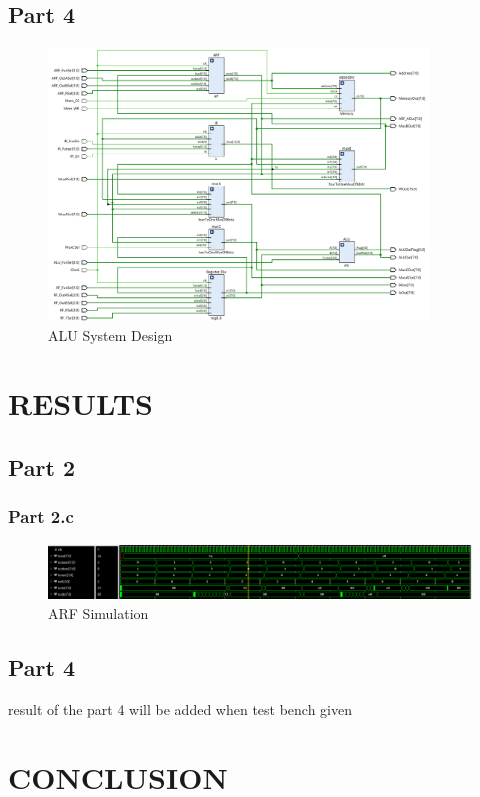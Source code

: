 \documentclass[pdftex,12pt,a4paper]{article}
\begin{document}
\subsection{Part 4}
    \begin{figure}[H]
    	\centering
    	\includegraphics[width=0.9\textwidth]{design/ALU_system.png}	
    	\caption{ALU System Design}
    	\label{ALU System Design}
    \end{figure}








\section{RESULTS}
\subsection{Part 2}
\subsubsection{Part 2.c}
\begin{figure}[H]
	\centering
	\includegraphics[width=1\textwidth]{results/arf.png}	
	\caption{ARF Simulation}
	\label{ARF Simulation}
\end{figure}


\subsection{Part 4}
result of the part 4 will be added when test bench given


\section{CONCLUSION}
\end{document}

